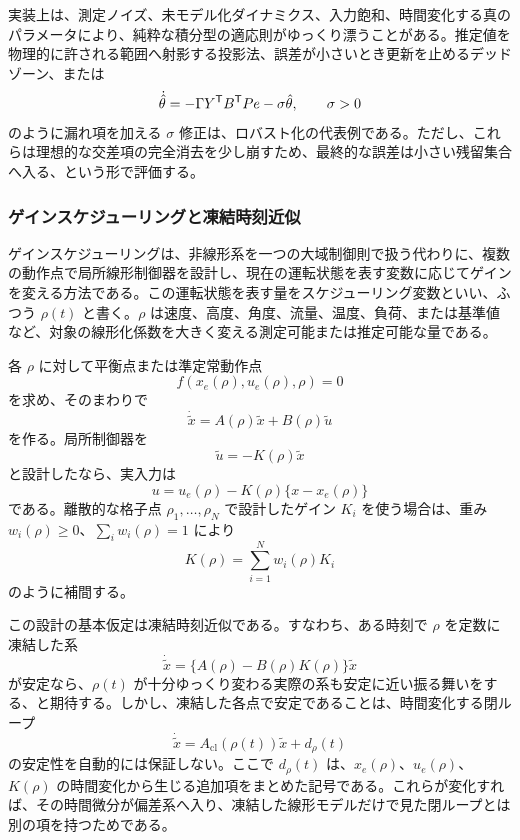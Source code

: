 実装上は、測定ノイズ、未モデル化ダイナミクス、入力飽和、時間変化する真のパラメータにより、純粋な積分型の適応則がゆっくり漂うことがある。推定値を物理的に許される範囲へ射影する投影法、誤差が小さいとき更新を止めるデッドゾーン、または
\begin{equation}
  \dot{\hat{\theta}}
  =-\Gamma Y^{\mathsf{T}} B^{\mathsf{T}} Pe-\sigma\hat{\theta},
  \qquad \sigma>0
\end{equation}
のように漏れ項を加える $\sigma$ 修正は、ロバスト化の代表例である。ただし、これらは理想的な交差項の完全消去を少し崩すため、最終的な誤差は小さい残留集合へ入る、という形で評価する。

\subsubsection{ゲインスケジューリングと凍結時刻近似}

ゲインスケジューリングは、非線形系を一つの大域制御則で扱う代わりに、複数の動作点で局所線形制御器を設計し、現在の運転状態を表す変数に応じてゲインを変える方法である。この運転状態を表す量をスケジューリング変数といい、ふつう $\rho(t)$ と書く。$\rho$ は速度、高度、角度、流量、温度、負荷、または基準値など、対象の線形化係数を大きく変える測定可能または推定可能な量である。

各 $\rho$ に対して平衡点または準定常動作点
\begin{equation}
  f(x_e(\rho),u_e(\rho),\rho)=0
\end{equation}
を求め、そのまわりで
\begin{equation}
  \dot{\tilde{x}}=A(\rho)\tilde{x}+B(\rho)\tilde{u}
\end{equation}
を作る。局所制御器を
\begin{equation}
  \tilde{u}=-K(\rho)\tilde{x}
\end{equation}
と設計したなら、実入力は
\begin{equation}
  u=u_e(\rho)-K(\rho)\{x-x_e(\rho)\}
\end{equation}
である。離散的な格子点 $\rho_1,\ldots,\rho_N$ で設計したゲイン $K_i$ を使う場合は、重み $w_i(\rho)\ge0$、$\sum_iw_i(\rho)=1$ により
\begin{equation}
  K(\rho)=\sum_{i=1}^{N}w_i(\rho)K_i
\end{equation}
のように補間する。

この設計の基本仮定は凍結時刻近似である。すなわち、ある時刻で $\rho$ を定数に凍結した系
\begin{equation}
  \dot{\tilde{x}}
  =
  \{A(\rho)-B(\rho)K(\rho)\}\tilde{x}
\end{equation}
が安定なら、$\rho(t)$ が十分ゆっくり変わる実際の系も安定に近い振る舞いをする、と期待する。しかし、凍結した各点で安定であることは、時間変化する閉ループ
\begin{equation}
  \dot{\tilde{x}}
  =
  A_\mathrm{cl}(\rho(t))\tilde{x}
  +d_\rho(t)
\end{equation}
の安定性を自動的には保証しない。ここで $d_\rho(t)$ は、$x_e(\rho)$、$u_e(\rho)$、$K(\rho)$ の時間変化から生じる追加項をまとめた記号である。これらが変化すれば、その時間微分が偏差系へ入り、凍結した線形モデルだけで見た閉ループとは別の項を持つためである。

